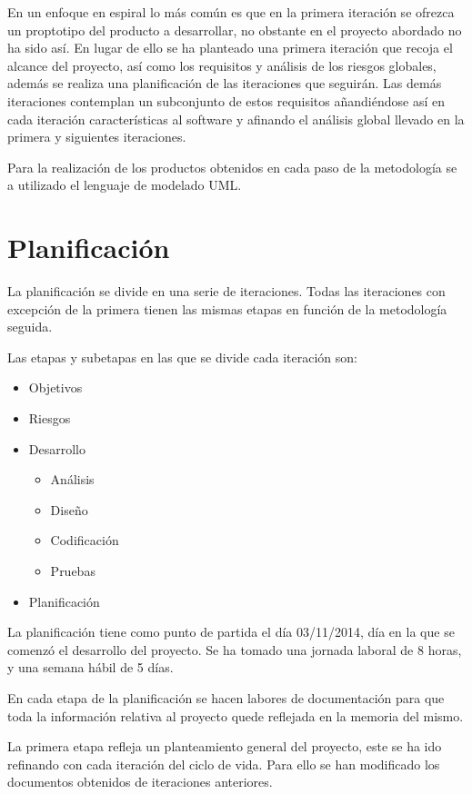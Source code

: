 En un enfoque en espiral lo más común es que en la primera iteración se ofrezca un proptotipo del producto a desarrollar, 
no obstante en el proyecto abordado no ha sido así. En lugar de ello se ha planteado una primera iteración que recoja el alcance 
del proyecto, así como los requisitos y análisis de los riesgos globales, además se realiza una planificación de las iteraciones que seguirán. 
Las demás iteraciones contemplan un subconjunto de estos requisitos añandiéndose así en cada iteración características al software y afinando el 
análisis global llevado en la primera y siguientes iteraciones.

Para la realización de los productos obtenidos en cada paso de la metodología se a utilizado el lenguaje de modelado UML. 
\section{Planificación}

La planificación se divide en una serie de iteraciones. Todas las 
iteraciones con excepción de la primera tienen las mismas etapas
en función de la metodología seguida.

Las etapas y subetapas en las que se divide cada iteración son:

\begin {itemize}
\item Objetivos
\item Riesgos
\item Desarrollo
\begin{itemize}
\item Análisis
\item Diseño
\item Codificación
\item Pruebas
\end{itemize}
\item Planificación
\end {itemize}

La planificación tiene como punto de partida el día 03/11/2014, día en la que se 
comenzó el desarrollo del proyecto. Se ha tomado una jornada laboral de 8 horas, 
y una semana hábil de 5 días.

En cada etapa de la planificación se hacen labores de documentación para que
toda la información relativa al proyecto quede reflejada en la memoria 
del mismo. 

La primera etapa refleja un planteamiento general del proyecto, este se ha ido refinando 
con cada iteración del ciclo de vida. Para ello se han modificado los documentos obtenidos de 
iteraciones anteriores.

